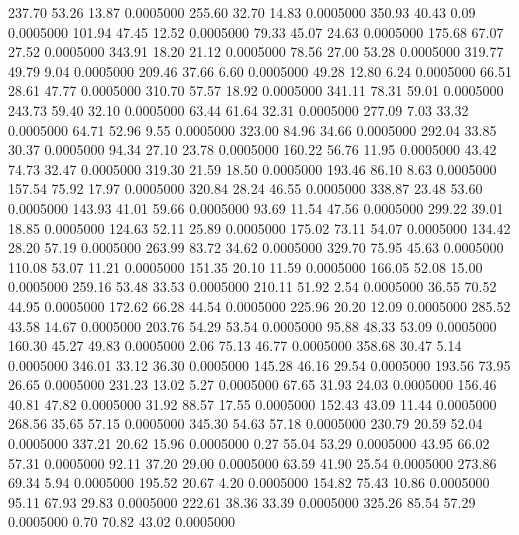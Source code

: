  237.70   53.26   13.87   0.0005000
 255.60   32.70   14.83   0.0005000
 350.93   40.43    0.09   0.0005000
 101.94   47.45   12.52   0.0005000
  79.33   45.07   24.63   0.0005000
 175.68   67.07   27.52   0.0005000
 343.91   18.20   21.12   0.0005000
  78.56   27.00   53.28   0.0005000
 319.77   49.79    9.04   0.0005000
 209.46   37.66    6.60   0.0005000
  49.28   12.80    6.24   0.0005000
  66.51   28.61   47.77   0.0005000
 310.70   57.57   18.92   0.0005000
 341.11   78.31   59.01   0.0005000
 243.73   59.40   32.10   0.0005000
  63.44   61.64   32.31   0.0005000
 277.09    7.03   33.32   0.0005000
  64.71   52.96    9.55   0.0005000
 323.00   84.96   34.66   0.0005000
 292.04   33.85   30.37   0.0005000
  94.34   27.10   23.78   0.0005000
 160.22   56.76   11.95   0.0005000
  43.42   74.73   32.47   0.0005000
 319.30   21.59   18.50   0.0005000
 193.46   86.10    8.63   0.0005000
 157.54   75.92   17.97   0.0005000
 320.84   28.24   46.55   0.0005000
 338.87   23.48   53.60   0.0005000
 143.93   41.01   59.66   0.0005000
  93.69   11.54   47.56   0.0005000
 299.22   39.01   18.85   0.0005000
 124.63   52.11   25.89   0.0005000
 175.02   73.11   54.07   0.0005000
 134.42   28.20   57.19   0.0005000
 263.99   83.72   34.62   0.0005000
 329.70   75.95   45.63   0.0005000
 110.08   53.07   11.21   0.0005000
 151.35   20.10   11.59   0.0005000
 166.05   52.08   15.00   0.0005000
 259.16   53.48   33.53   0.0005000
 210.11   51.92    2.54   0.0005000
  36.55   70.52   44.95   0.0005000
 172.62   66.28   44.54   0.0005000
 225.96   20.20   12.09   0.0005000
 285.52   43.58   14.67   0.0005000
 203.76   54.29   53.54   0.0005000
  95.88   48.33   53.09   0.0005000
 160.30   45.27   49.83   0.0005000
   2.06   75.13   46.77   0.0005000
 358.68   30.47    5.14   0.0005000
 346.01   33.12   36.30   0.0005000
 145.28   46.16   29.54   0.0005000
 193.56   73.95   26.65   0.0005000
 231.23   13.02    5.27   0.0005000
  67.65   31.93   24.03   0.0005000
 156.46   40.81   47.82   0.0005000
  31.92   88.57   17.55   0.0005000
 152.43   43.09   11.44   0.0005000
 268.56   35.65   57.15   0.0005000
 345.30   54.63   57.18   0.0005000
 230.79   20.59   52.04   0.0005000
 337.21   20.62   15.96   0.0005000
   0.27   55.04   53.29   0.0005000
  43.95   66.02   57.31   0.0005000
  92.11   37.20   29.00   0.0005000
  63.59   41.90   25.54   0.0005000
 273.86   69.34    5.94   0.0005000
 195.52   20.67    4.20   0.0005000
 154.82   75.43   10.86   0.0005000
  95.11   67.93   29.83   0.0005000
 222.61   38.36   33.39   0.0005000
 325.26   85.54   57.29   0.0005000
   0.70   70.82   43.02   0.0005000
